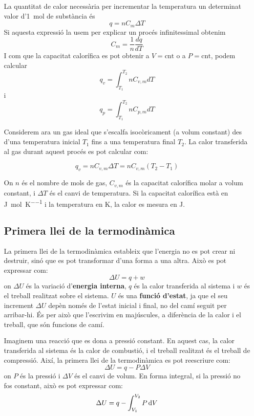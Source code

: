 La quantitat de calor necessària per incrementar la temperatura un determinat valor d'\qty{1}{\mole} de substància és
\[
q=nC_m\Delta T
\]
Si aquesta expressió la usem per explicar un procés infinitessimal obtenim
\[
C_m=\frac{1}{n}\frac{dq}{dT}
\]
I com que la capacitat calorífica es pot obtenir a $V=\text{cnt}$ o a $P=\text{cnt}$, podem calcular
\[
q_v=\int_{T_1}^{T_2} n C_{v,m} dT
\]
i
\[
q_p=\int_{T_1}^{T_2} n C_{p,m} dT
\]

\begin{EXMP}

Considerem ara un gas ideal que s'escalfa isocòricament (a volum constant) des d'una temperatura inicial $T_1$ fins a una temperatura final $T_2$. La calor transferida al gas durant aquest procés es pot calcular com:

\[
q_v = n C_{v,m} \Delta T = n C_{v,m} (T_2 - T_1)
\]

On $n$ és el nombre de mols de gas, $C_{v,m}$ és la capacitat calorífica molar a volum constant, i $\Delta T$ és el canvi de temperatura. Si la capacitat calorífica està en \si{\joule\per\mole\per\kelvin} i la temperatura en \si{\kelvin}, la calor es mesura en \si{\joule}.
\end{EXMP}

\subsection{Primera llei de la termodinàmica}

La primera llei de la termodinàmica estableix que l'energia no es pot crear ni destruir, sinó que es pot transformar d'una forma a una altra. Això es pot expressar com:
\begin{equation}
    \Delta U = q + w
\end{equation}
on $\Delta U$ és la variació d'{\bf energia interna}, $q$ és la calor transferida al sistema i $w$ és el treball realitzat sobre el sistema. $U$ és una {\bf funció d'estat}, ja que el seu increment $\Delta U$ depèn només de l'estat inicial i final, no del camí seguit per arribar-hi. És per això que l'escrivim en majúscules, a diferència de la calor i el treball, que són funcions de camí.

Imaginem una reacció que es dona a pressió constant. En aquest cas, la calor transferida al sistema és la calor de combustió, i el treball realitzat és el treball de compressió. Així, la primera llei de la termodinàmica es pot reescriure com:
\begin{equation}
    \Delta U = q - P \Delta V
\end{equation}
on $P$ és la pressió i $\Delta V$ és el canvi de volum.
En forma integral, si la pressió no fos constant, això es pot expressar com:
\begin{equation}
    \Delta U = q - \int_{V_1}^{V_2} P \mathop{}\!\mathrm{d} V
\end{equation}

